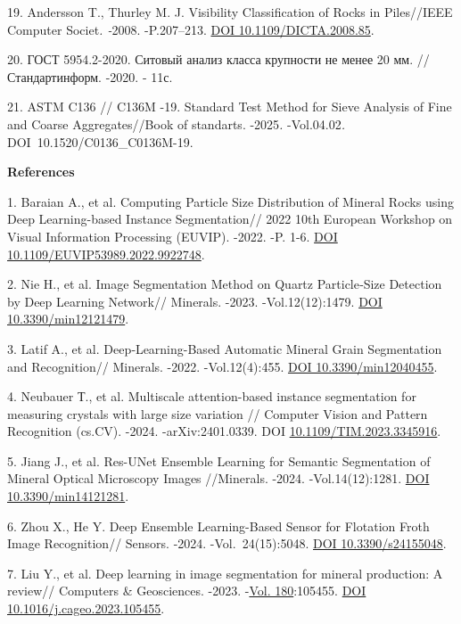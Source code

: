 \begin{refs}
19. Andersson T., Thurley M. J. Visibility Classification of Rocks in
Piles//IEEE Computer Societ\emph{. -}2008. -P.207--213.
\href{https://doi.org/10.1109/DICTA.2008.85}{DOI 10.1109/DICTA.2008.85}.

20. ГОСТ 5954.2-2020. Ситовый анализ класса крупности не менее 20 мм.
//Стандартинформ. -2020. - 11с.

21. ASTM C136 // C136M -19. Standard Test Method for Sieve Analysis of
Fine and Coarse Aggregates//Book of standarts. -2025\emph{.}
-Vol.04.02\emph{.} DOI~10.1520/C0136\_C0136M-19.
\end{refs}

\begin{center}
{\bfseries References}
\end{center}

\begin{refs}
1. Baraian A., et al. Computing Particle Size Distribution of Mineral
Rocks using Deep Learning-based Instance Segmentation// 2022 10th
European Workshop on Visual Information Processing (EUVIP). -2022. -P.
1-6. \href{https://doi.org/10.1109/EUVIP53989.2022.9922748}{DOI
10.1109/EUVIP53989.2022.9922748}.

2. Nie H., et al. Image Segmentation Method on Quartz Particle‑Size
Detection by Deep Learning Network// Minerals. -2023. -Vol.12(12):1479.
\href{https://doi.org/10.3390/min12121479}{DOI 10.3390/min12121479}.

3. Latif A., et al. Deep‑Learning-Based Automatic Mineral Grain
Segmentation and Recognition// Minerals. -2022. -Vol.12(4):455.
\href{https://doi.org/10.3390/min12040455}{DOI 10.3390/min12040455}.

4. Neubauer Т., et al. Multiscale attention-based instance segmentation
for measuring crystals with large size variation // Computer Vision and
Pattern Recognition (cs.CV). -2024. -arXiv:2401.0339. DOI
\href{https://doi.org/10.1109/TIM.2023.3345916}{10.1109/TIM.2023.3345916}.

5. Jiang J., et al. Res-UNet Ensemble Learning for Semantic Segmentation
of Mineral Optical Microscopy Images //Minerals. -2024.
-Vol.14(12):1281. \href{https://doi.org/10.3390/min14121281}{DOI
10.3390/min14121281}.

6. Zhou X., He Y. Deep Ensemble Learning-Based Sensor for Flotation
Froth Image Recognition// Sensors. -2024. -Vol.~24(15):5048.
\href{https://doi.org/10.3390/s24155048}{DOI 10.3390/s24155048}.

7. Liu Y., et al. Deep learning in image segmentation for mineral
production: A review// Computers \& Geosciences. -2023.
-\href{https://www.sciencedirect.com/journal/computers-and-geosciences/vol/180/suppl/C}{Vol.
180}:105455. \href{https://doi.org/10.1016/j.cageo.2023.105455}{DOI
10.1016/j.cageo.2023.105455}.


\end{refs}
